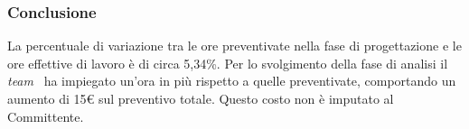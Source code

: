 \subsubsection{Conclusione}
La percentuale di variazione tra le ore preventivate nella fase di 
progettazione e le ore effettive di lavoro è di circa 5,34\%.
Per lo svolgimento della fase di analisi il \textit{team} \GRUPPO\ ha impiegato 
un'ora in più rispetto a quelle preventivate, comportando un aumento di 15€ sul 
preventivo totale. Questo costo non è imputato al Committente.
